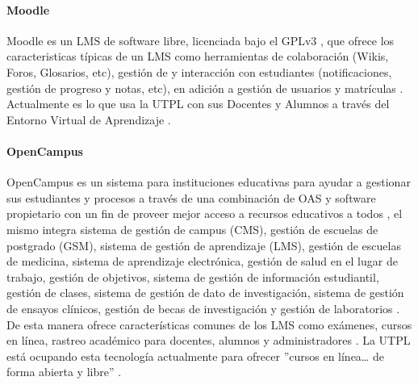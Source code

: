 \paragraph{Moodle}
Moodle es un LMS  de software libre, licenciada bajo el GPLv3 \citep{MOODLE-GIT-License},  que ofrece los caracteristicas típicas de un LMS  como herramientas de colaboración (Wikis, Foros, Glosarios, etc), gestión de y interacción con estudiantes (notificaciones, gestión de progreso y notas, etc), en adición a gestión de usuarios y matrículas \citep{MOODLE-DOCS-Features}. Actualmente es lo que usa la UTPL con sus Docentes y Alumnos a través del Entorno Virtual de Aprendizaje \citep{Lopez-Jorge}.

\paragraph{OpenCampus}
OpenCampus es un sistema para instituciones educativas para ayudar a gestionar sus estudiantes y procesos a través de una combinación de OAS y software propietario con un fin de proveer mejor acceso a recursos educativos a todos \citep{OpenCampus-Tecnology}, el mismo integra sistema de gestión de campus (CMS), gestión de escuelas de postgrado (GSM), sistema de gestión de aprendizaje (LMS), gestión de escuelas de medicina, sistema de aprendizaje electrónica, gestión de salud en el lugar de trabajo, gestión de objetivos, sistema de gestión de información estudiantil, gestión de clases, sistema de gestión de dato de investigación, sistema de gestión de ensayos clínicos, gestión de becas de investigación y gestión de laboratorios \citep{OpenCampus-Home}. De esta manera ofrece características comunes de los LMS  como exámenes, cursos en línea, rastreo académico para docentes, alumnos y administradores \citep{OpenCampus-Tecnology} \citep{OpenCampus-Universities}. La UTPL está ocupando esta tecnología actualmente para ofrecer ''cursos en línea\ldots{} de forma abierta y libre'' \citep{UTPL-OpenCampus}.

